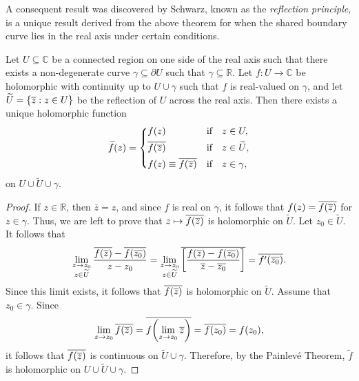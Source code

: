 A consequent result was discovered by Schwarz, known as the \textit{reflection principle}, is a unique result derived from the above theorem for when the shared boundary curve lies in the real axis under certain conditions.
\begin{theorem}\label{thm:riemannschwarzreflection}
    Let \(U\subseteq\mathbb{C}\) be a connected region on one side of the real axis such that there exists a non-degenerate curve \(\gamma\subseteq\partial U\) such that \(\gamma\subseteq\mathbb{R}\). Let \(f:U\to\mathbb{C}\) be holomorphic with continuity up to \(U\cup\gamma\) such that \(f\) is real-valued on \(\gamma\), and let \(\widetilde{U}=\cbraces{\overline{z}}{z\in U}\) be the reflection of \(U\) across the real axis. Then there exists a unique holomorphic function \[\widetilde{f}(z)=
        \begin{dcases}
            f(z)                                 & \qif* z\in U,            \\
            \overline{f(\overline{z})}           & \qif* z\in\widetilde{U}, \\
            f(z)\equiv\overline{f(\overline{z})} & \qif* z\in\gamma,
        \end{dcases}\] on \(U\cup\widetilde{U}\cup\gamma\).
\end{theorem}
\begin{proof}
    If \(z\in\mathbb{R}\), then \(\overline{z}=z\), and since \(f\) is real on \(\gamma\), it follows that \(f(z)=\overline{f\qty(\overline{z})}\) for \(z\in\gamma\). Thus, we are left to prove that \(z\mapsto\overline{f\qty(\overline{z})}\) is holomorphic on \(\widetilde{U}\). Let \(z_0\in\widetilde{U}\). It follows that \[\lim_{\substack{z\to z_0\\ z\in\widetilde{U}}}\frac{\overline{f\qty(\overline{z})}-\overline{f\qty(\overline{z_0})}}{z-z_0}=\lim_{\substack{z\to z_0\\ z\in\widetilde{U}}}\overline{\qty[\frac{f\qty(\overline{z})-f\qty(\overline{z_0})}{\overline{z}-\overline{z_0}}]}=\overline{f'\qty(\overline{z_0})}.\]
    Since this limit exists, it follows that \(\overline{f\qty(\overline{z})}\) is holomorphic on \(\widetilde{U}\). Assume that \(z_0\in\gamma\). Since \[\lim_{z\to z_0}\overline{f\qty(\overline{z})}=\overline{f\qty(\lim_{z\to z_0}\overline{z})}=\overline{f\qty(z_0)}=f\qty(z_0),\] it follows that \(\overline{f\qty(\overline{z})}\) is continuous on \(\widetilde{U}\cup\gamma\). Therefore, by the Painlevé Theorem, \(\widetilde{f}\) is holomorphic on \(U\cup\widetilde{U}\cup\gamma\).
\end{proof}
